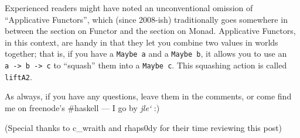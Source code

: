 \documentclass[]{article}
\begin{document}
Experienced readers might have noted an unconventional omission of ``Applicative
Functors'', which (since 2008-ish) traditionally goes somewhere in between the
section on Functor and the section on Monad. Applicative Functors, in this
context, are handy in that they let you combine two values in worlds together;
that is, if you have a \texttt{Maybe\ a} and a \texttt{Maybe\ b}, it allows you
to use an \texttt{a\ -\textgreater{}\ b\ -\textgreater{}\ c} to ``squash'' them
into a \texttt{Maybe\ c}. This squashing action is called \texttt{liftA2}.

As always, if you have any questions, leave them in the comments, or come find
me on freenode's \#haskell --- I go by \emph{jle`} :)

(Special thanks to c\_wraith and rhaps0dy for their time reviewing this post)
\end{document}
